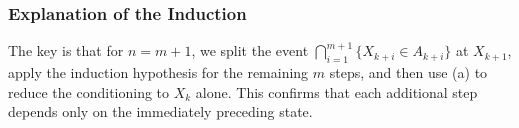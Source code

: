 \documentclass{tufte-handout}
\makeatletter
\renewcommand{\section}{\@startsection{section}%
    {3}{-1.01em}{-3ex \@plus -1ex \@minus -.2ex}%
    {1.5ex \@plus .2ex}
    {\hspace*{-5.5em}\fcolorbox{blue}{blue}{\parbox[c][1.0ex][b]{4em}{\phantom{space}}}
    \normalfont\Large\itshape\color{blue}}}
\makeatother
\begin{document}
\subsubsection*{Explanation of the Induction}
The key is that for $n=m+1$, we split the event $\bigcap_{i=1}^{m+1}\{X_{k+i} \in A_{k+i}\}$ at $X_{k+1}$, 
apply the induction hypothesis for the remaining $m$ steps, and then use (a) to reduce the conditioning 
to $X_k$ alone. This confirms that each additional step depends only on the immediately preceding state.



\makeatletter
  \renewcommand{\section}{\@startsection{section}%
    {3}{0.8em}{-3ex \@plus -1ex \@minus -.2ex}%
    {1.5ex \@plus .2ex}
    {\hspace*{-5.5em}\fcolorbox{Periwinkle}{Periwinkle}{\parbox[c][1.0ex][b]{4em}{\phantom{space}}}
    \normalfont\Large\itshape\color{blue}}}
\makeatother



\end{document}
